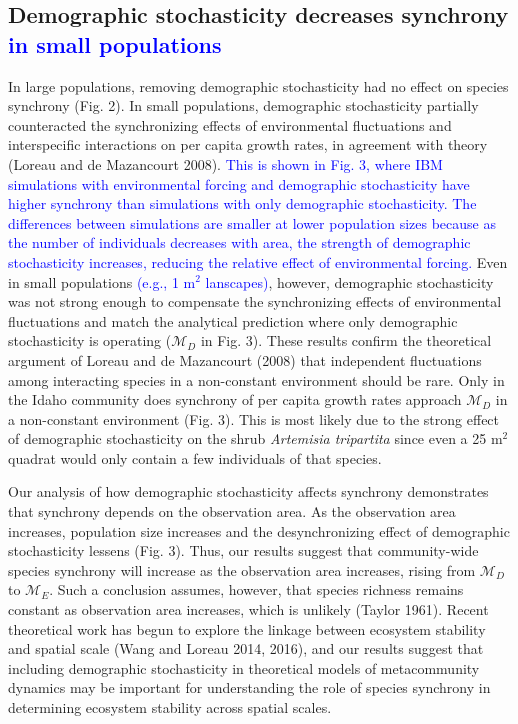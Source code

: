 \documentclass[12pt,]{article}
\begin{document}
\subsection{Demographic stochasticity decreases synchrony \textcolor{blue}{in small populations}}

In large populations, removing demographic stochasticity had no effect
on species synchrony (Fig. 2). In small populations, demographic
stochasticity partially counteracted the synchronizing effects of
environmental fluctuations and interspecific interactions on per capita
growth rates, in agreement with theory (Loreau and {{de Mazancourt}}
2008).
\textcolor{blue}{This is shown in Fig. 3, where IBM simulations with environmental forcing and demographic stochasticity have higher synchrony than simulations with only demographic stochasticity.
The differences between simulations are smaller at lower population sizes because as the number of individuals decreases with area, the strength of demographic stochasticity increases, reducing the relative effect of environmental forcing.}
Even in small populations
\textcolor{blue}{(e.g., 1 $\text{m}^2$ lanscapes)}, however, demographic
stochasticity was not strong enough to compensate the synchronizing
effects of environmental fluctuations and match the analytical
prediction where only demographic stochasticity is operating
(\(\mathcal{M}_D\) in Fig. 3). These results confirm the theoretical
argument of Loreau and {{de Mazancourt}} (2008) that independent
fluctuations among interacting species in a non-constant environment
should be rare. Only in the Idaho community does synchrony of per capita
growth rates approach \(\mathcal{M}_D\) in a non-constant environment
(Fig. 3). This is most likely due to the strong effect of demographic
stochasticity on the shrub \emph{Artemisia tripartita} since even a 25
\(\text{m}^2\) quadrat would only contain a few individuals of that
species.

Our analysis of how demographic stochasticity affects synchrony
demonstrates that synchrony depends on the observation area. As the
observation area increases, population size increases and the
desynchronizing effect of demographic stochasticity lessens (Fig. 3).
Thus, our results suggest that community-wide species synchrony will
increase as the observation area increases, rising from
\(\mathcal{M}_D\) to \(\mathcal{M}_E\). Such a conclusion assumes,
however, that species richness remains constant as observation area
increases, which is unlikely (Taylor 1961). Recent theoretical work has
begun to explore the linkage between ecosystem stability and spatial
scale (Wang and Loreau 2014, 2016), and our results suggest that
including demographic stochasticity in theoretical models of
metacommunity dynamics may be important for understanding the role of
species synchrony in determining ecosystem stability across spatial
scales.
\end{document}
